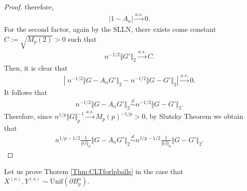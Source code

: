 \documentclass[10pt]{amsart}
\numberwithin{equation}{section}
\begin{document}
\begin{proof}
therefore,
\begin{align*}
|1-A_n| \overset{a.s.}{\to} 0.
\end{align*}
For the second factor, again by the SLLN, there exists come constant $C:=\sqrt{M_p(2)}>0$ such that
\begin{align*}
n^{-1/2} \Vert G' \Vert _2  \overset{a.s.}{\longrightarrow} C .
\end{align*}
Then, it is clear that
\begin{align*}
\left| \; n^{-1/2}\left\Vert  G - A_n G' \right\Vert_2 - n^{-1/2} \left\Vert  G - G'  \right\Vert_2 \right| \overset{a.s.}{\to} 0.
\end{align*}
It follows that
\begin{align*}
 n^{-1/2}\left\Vert  G - A_n G' \right\Vert_2  \overset{d}{\sim} n^{-1/2} \left\Vert  G - G'  \right\Vert_2 .
\end{align*}
Therefore, since $n^{1/p} \Vert G \Vert _p^{-1} \overset{a.s.}{\to} M_p(p) ^{-1/p} >0$, by Slutsky Theorem we obtain that
\begin{align*}
 n^{1/p-1/2} \frac{1}{\Vert G \Vert_p} \left\Vert  G - A_n G' \right\Vert_2  \overset{d}{\sim} n^{1/p-1/2} \frac{1}{\Vert G \Vert_p} \left\Vert  G - G'  \right\Vert_2 .
\end{align*}
\end{proof}

Let us prove Thorem \ref{Thm:CLTforlpballs} in the case that $X^{(n)}, Y^{(n)} \sim \text{Unif} ( \partial B_p^ n)$.
\end{document}
